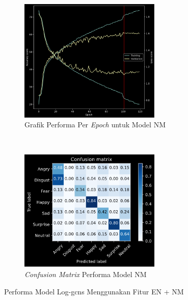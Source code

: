 \begin{figure}[t]
\begin{subfigure}[t]{6.75cm}
        \includegraphics[width=6.75cm]{gambar/eksperimen5b1_grafik2.png}
        \caption{Grafik Performa Per \textit{Epoch} untuk Model NM}
        \label{fig:grafikeksperimen5b12}
    \end{subfigure}
    ~~~
    \begin{subfigure}[t]{6.75cm}
        \includegraphics[width=6.75cm]{gambar/eksperimen5b1_matriks2.png}
        \caption{\textit{Confusion Matrix} Performa Model NM}
        \label{fig:confusionmatrixeksperimen5b12}
    \end{subfigure}
    \caption{Performa Model Log-\acrshort{gcns} Menggunakan Fitur EN + NM}
    \label{fig:hasileksperimen5b1}
\end{figure}
